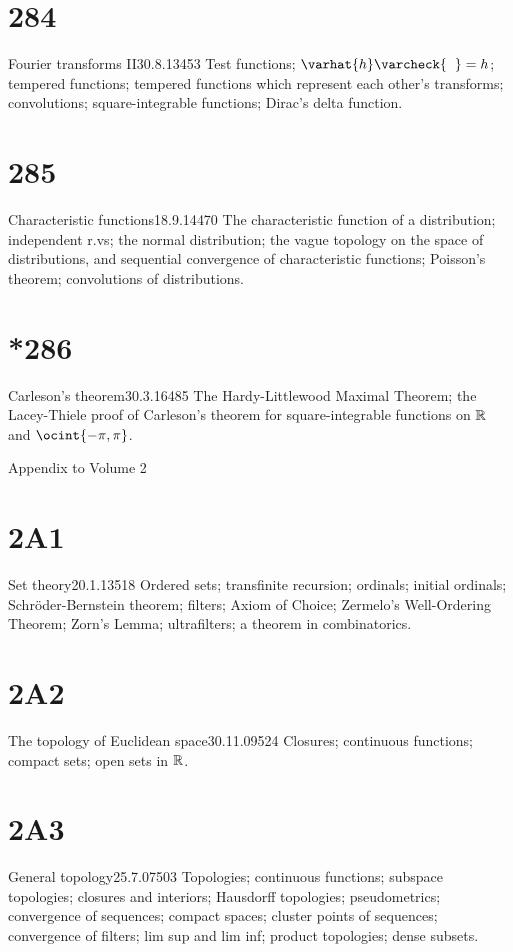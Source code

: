 \section{284}{Fourier transforms II}{30.8.13}{453}{}
{Test functions;  $\varhat{h}\varcheck{\phantom{h}}=h$;  tempered
functions;  tempered functions which represent each other's transforms;
convolutions;  square-integrable functions;  Dirac's delta function.}

\section{285}{Characteristic functions}{18.9.14}{470}{}
{The characteristic function of a distribution;  independent
r.vs;  the normal distribution;  the vague topology on the space of
distributions, and sequential convergence of characteristic functions;
Poisson's theorem;  convolutions of distributions.}

\section{*286}{Carleson's theorem}{30.3.16}{485}{}
{The Hardy-Littlewood Maximal Theorem;  the Lacey-Thiele proof of
Carleson's theorem for square-integrable functions on $\Bbb{R}$ and
$\ocint{-\pi,\pi}$.}


 Appendix to Volume 2


\section{2A1}{Set theory}{20.1.13}{518}{}
{Ordered sets;  transfinite recursion;  ordinals;  initial
ordinals;  Schr\"oder-\vthsp{}Bernstein theorem;  filters;  Axiom of
Choice;
Zermelo's Well-Ordering Theorem;  Zorn's Lemma;  ultrafilters;  a theorem
in combinatorics.}

\section{2A2}{The topology of Euclidean space}{30.11.09}{524}{}
{Closures;  continuous functions;  compact sets;  open sets in $\Bbb{R}$.}

\section{2A3}{General topology}{25.7.07}{503}{}
{Topologies;  continuous functions;  subspace topologies;
closures and interiors;
Hausdorff topologies;  pseudometrics;  convergence of sequences;
compact spaces;  cluster points of sequences;  convergence of filters;
lim sup and lim inf;  product topologies;  dense subsets.}

